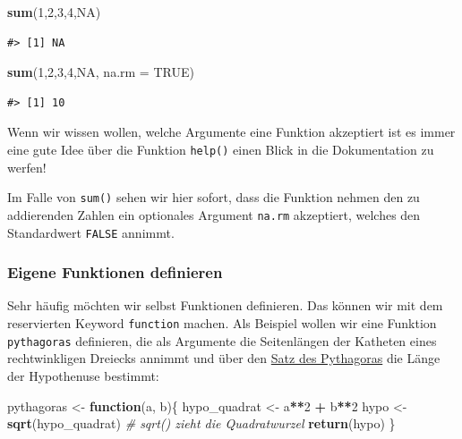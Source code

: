 \documentclass[]{book}
\newenvironment{Shaded}{\begin{snugshade}}{\end{snugshade}}
\newcommand{\KeywordTok}[1]{\textcolor[rgb]{0.13,0.29,0.53}{\textbf{#1}}}
\newcommand{\DataTypeTok}[1]{\textcolor[rgb]{0.13,0.29,0.53}{#1}}
\newcommand{\DecValTok}[1]{\textcolor[rgb]{0.00,0.00,0.81}{#1}}
\newcommand{\StringTok}[1]{\textcolor[rgb]{0.31,0.60,0.02}{#1}}
\newcommand{\CommentTok}[1]{\textcolor[rgb]{0.56,0.35,0.01}{\textit{#1}}}
\newcommand{\OtherTok}[1]{\textcolor[rgb]{0.56,0.35,0.01}{#1}}
\newcommand{\ControlFlowTok}[1]{\textcolor[rgb]{0.13,0.29,0.53}{\textbf{#1}}}
\newcommand{\OperatorTok}[1]{\textcolor[rgb]{0.81,0.36,0.00}{\textbf{#1}}}
\newcommand{\NormalTok}[1]{#1}
\begin{document}
\begin{Shaded}
\begin{Highlighting}[]
\KeywordTok{sum}\NormalTok{(}\DecValTok{1}\NormalTok{,}\DecValTok{2}\NormalTok{,}\DecValTok{3}\NormalTok{,}\DecValTok{4}\NormalTok{,}\OtherTok{NA}\NormalTok{) }
\end{Highlighting}
\end{Shaded}

\begin{verbatim}
#> [1] NA
\end{verbatim}

\begin{Shaded}
\begin{Highlighting}[]
\KeywordTok{sum}\NormalTok{(}\DecValTok{1}\NormalTok{,}\DecValTok{2}\NormalTok{,}\DecValTok{3}\NormalTok{,}\DecValTok{4}\NormalTok{,}\OtherTok{NA}\NormalTok{, }\DataTypeTok{na.rm =} \OtherTok{TRUE}\NormalTok{) }
\end{Highlighting}
\end{Shaded}

\begin{verbatim}
#> [1] 10
\end{verbatim}

Wenn wir wissen wollen, welche Argumente eine Funktion akzeptiert ist es
immer eine gute Idee über die Funktion \texttt{help()} einen Blick in
die Dokumentation zu werfen!

Im Falle von \texttt{sum()} sehen wir hier sofort, dass die Funktion
nehmen den zu addierenden Zahlen ein optionales Argument \texttt{na.rm}
akzeptiert, welches den Standardwert \texttt{FALSE} annimmt.

\subsubsection{Eigene Funktionen
definieren}\label{eigene-funktionen-definieren}

Sehr häufig möchten wir selbst Funktionen definieren. Das können wir mit
dem reservierten Keyword \texttt{function} machen. Als Beispiel wollen
wir eine Funktion \texttt{pythagoras} definieren, die als Argumente die
Seitenlängen der Katheten eines rechtwinkligen Dreiecks annimmt und über
den \href{https://de.wikipedia.org/wiki/Satz_des_Pythagoras}{Satz des
Pythagoras} die Länge der Hypothenuse bestimmt:

\begin{Shaded}
\begin{Highlighting}[]
\NormalTok{pythagoras <-}\StringTok{ }\ControlFlowTok{function}\NormalTok{(a, b)\{}
\NormalTok{  hypo_quadrat <-}\StringTok{ }\NormalTok{a}\OperatorTok{**}\DecValTok{2} \OperatorTok{+}\StringTok{ }\NormalTok{b}\OperatorTok{**}\DecValTok{2}
\NormalTok{  hypo <-}\StringTok{ }\KeywordTok{sqrt}\NormalTok{(hypo_quadrat) }\CommentTok{# sqrt() zieht die Quadratwurzel}
  \KeywordTok{return}\NormalTok{(hypo)}
\NormalTok{\}}
\end{Highlighting}
\end{Shaded}
\end{document}
